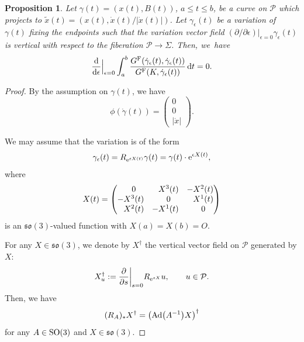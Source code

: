 \documentclass[pdftex]{sigma}
\numberwithin{equation}{section}
\newtheorem{Proposition}[Theorem]{Proposition}
 { \theoremstyle{definition}
\newtheorem{Definition}[Theorem]{Definition}
\newtheorem*{Notation}{Notation}
\newtheorem{Example}[Theorem]{Example}
\newtheorem{Remark}[Theorem]{Remark} }
\begin{document}
\begin{Proposition}\label{vertical-variation}
Let $\gamma(t)=(x(t), B(t))$, $a\le t\le b$, be a curve on $\mathcal{P}$ which projects to $\tilde x(t)=(x(t), \dot x(t)/|\dot x(t)|)$. Let $\gamma_\epsilon(t)$ be a variation of $\gamma(t)$ fixing the endpoints such that the variation vector field $(\partial/\partial \epsilon)|_{\epsilon=0}\gamma_\epsilon(t)$ is vertical with respect to the fiberation $\mathcal{P}\to \Sigma$. Then, we~have
\[
\frac{\mathrm{d}}{\mathrm{d} \epsilon}\Big|_{\epsilon=0}
\int _a^b \frac{G^{\mathrm{F}}(\dot \gamma_\epsilon(t), \dot \gamma_\epsilon(t))}{G^{\mathrm{F}}(K, \dot \gamma_\epsilon(t))}\,{\rm d}t=0.
\]
\end{Proposition}
\begin{proof}
By the assumption on $\gamma(t)$, we have
\begin{equation}\label{phi-gamma}
\phi(\dot\gamma(t))=\begin{pmatrix} 0 \\ 0 \\ |\dot x|\end{pmatrix}.
\end{equation}

We may assume that the variation is of the form
\[
\gamma_\epsilon(t)=R_{{\rm e}^{\epsilon X(t)}}\gamma(t)=\gamma(t)\cdot {\rm e}^{\epsilon X(t)},
\]
where
\[
X(t)=\begin{pmatrix}
\hphantom{-}0 & \hphantom{-}X^3(t) & -X^2(t) \\
-X^3(t) & \hphantom{-}0 & \hphantom{-}X^1(t) \\
\hphantom{-}X^2(t) & -X^1(t) & \hphantom{-}0
\end{pmatrix}
\]
is an $\mathfrak{so}(3)$-valued function with $X(a)=X(b)=O$.

For any $X\in\mathfrak{so}(3)$, we denote by $X^\dagger$ the vertical vector field on $\mathcal{P}$ generated by $X$:
\[
X^\dagger_u:=\frac{\partial}{\partial s}\biggl|_{s=0}R_{{\rm e}^{sX}} u, \qquad u\in \mathcal{P}.
\]
Then, we have
\[
(R_{A})_* X^\dagger=\bigl({\rm Ad}\bigl(A^{-1}\bigr)X\bigr)^\dagger
\]
for any $A\in{\rm SO}(3)$ and $X\in\mathfrak{so}(3)$.


\end{proof}
\end{document}

